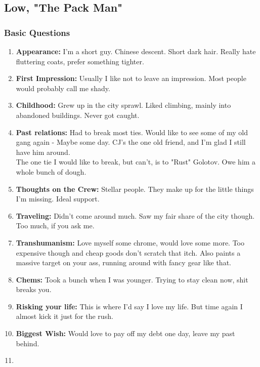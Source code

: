 \def\pfcname{The Pack Man}
\subsection{Low, "\pfcname"}
\vspace{10mm} %
\subsubsection{Basic Questions}
\begin{enumerate}
	\setlength\itemsep{-8mm}
	\item
		\textbf{Appearance:}
		I'm a short guy. Chinese descent. Short dark hair. Really hate fluttering coats, prefer something tighter.
	\item
		\textbf{First Impression:}
		Usually I like not to leave an impression.
		Most people would probably call me shady.
	\item
		\textbf{Childhood:}
		Grew up in the city sprawl.
		Liked climbing, mainly into abandoned buildings.
		Never got caught.
	\item
		\textbf{Past relations:}
		Had to break most ties.
		Would like to see some of my old gang again
		- Maybe some day.
		CJ's the one old friend,
		and I'm glad I still have him around.
		\\%
		The one tie I would like to break, but can't, is to "Rust" Golotov.
		Owe him a whole bunch of dough.
	\item
		\textbf{Thoughts on the Crew:}
		Stellar people. They make up for the little things I'm missing. Ideal support.
	\item
		\textbf{Traveling:}
		Didn't come around much.
		Saw my fair share of the city though.
		Too much, if you ask me.
	\item
		\textbf{Transhumanism:}
		Love myself some chrome, would love some more.
		Too expensive though and cheap goods don't scratch that itch.
		Also paints a massive target on your ass,
			running around with fancy gear like that.
	\item
		\textbf{Chems:}
		Took a bunch when I was younger. Trying to stay clean now, shit breaks you.
	\item
		\textbf{Risking your life:}
		This is where I'd say I love my life. But time again I almost kick it just for the rush.
	\item
		\textbf{Biggest Wish:}
		Would love to pay off my debt one day, leave my past behind.
	\item

\end{enumerate}
